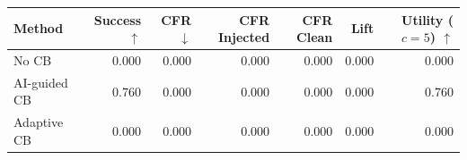 \begin{tabular}{lrrrrrr}
\toprule
Method & Success $\uparrow$ & CFR $\downarrow$ & CFR Injected & CFR Clean & Lift & Utility ($c=5$) $\uparrow$ \\
\midrule
No CB & 0.000 & 0.000 & 0.000 & 0.000 & 0.000 & 0.000 \\
AI-guided CB & 0.760 & 0.000 & 0.000 & 0.000 & 0.000 & 0.760 \\
Adaptive CB & 0.000 & 0.000 & 0.000 & 0.000 & 0.000 & 0.000 \\
\bottomrule
\end{tabular}
